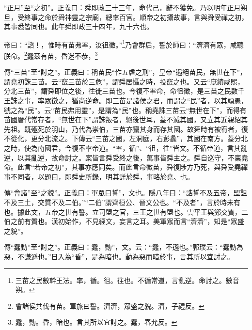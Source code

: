 {\noindent\shu{}\fzkt “正月”至“之初”。正義曰：舜即政三十三年，命代己，辭不獲免。乃以明年正月朔旦，受終事之命於舜神靈之宗廟，總率百官。順帝之初攝故事，言與舜受禪之初，其事悉皆同也。此年舜即政三十四年，九十六也。 \par}

帝曰：“諮！，惟時有苗弗率，汝徂徵。”\footnote{三苗之民數幹王法。率，循。徂。往也。不循常道，言亂逆。命討之。數音朔。}乃會群后，誓於師曰：“濟濟有眾，咸聽朕命。\footnote{會諸侯共伐有苗。軍旅曰誓。濟濟，眾盛之貌。濟，子禮反。}蠢茲有苗，昏迷不恭，\footnote{蠢，動。昏，暗也。言其所以宜討之。蠢，春允反。}

{\noindent\zhuan{}\fzbyks 傳“三苗”至“討之”。正義曰：稱苗民“作五虐之刑”，皇帝“遏絕苗民，無世在下”，謂堯初誅三苗。云“竄三苗於三危”，謂舜居攝之時，投竄之也。又云“庶績咸熙，分北三苗”，謂舜即位之後，往徙三苗也。今復不率命，命徂徵，是三苗之民數千王誅之事，率眾徵之，猶尚逆命。即三苗是諸侯之君，而謂之“民”者，以其頑愚，號之為“民”。云“苗民弗用靈”，是謂為“民”也。稱堯誅三苗云“無世在下”，而得有苗國曆代常存者，“無世在下”謂誅叛者，絕後世耳，蓋不滅其國，又立其近親紹其先祖。既殛死於羽山，乃代為崇伯，三苗亦竄其身而存其國。故舜時有被宥者，復不從化，更分北流之。下傳云“三苗之國，左洞庭，右彭蠡”，其國在南方。蓋分北之時，使為南國君，今復不率帝道。“率，循”、“徂，往”皆文。不循帝道，言其亂逆，以其亂逆，故命討之。案皆言舜受終之後，萬事皆舜主之。舜自巡守，不稟堯命。此言“若帝之初”，其事亦應同矣。而此言命徵苗，舜復陟方乃死，與舜受堯禪事不同者，以題曰，即舜史所錄，明其詳於舜，事略於堯、也。 \par}

{\noindent\zhuan{}\fzbyks 傳“會諸”至“之貌”。正義曰：軍眾曰誓”，文也。隱八年曰：“誥誓不及五帝，盟詛不及三土，交質不及二伯。”“二伯”謂齊桓公、晉文公也。“不及者”，言於時未有也。據此文，五帝之世有誓。立司盟之官，三王之世有盟也。雲平王與鄭交質，二伯之前有質也。漢初始作，不見經文，妄言之耳。美軍眾而言“濟濟”，知是“眾盛之貌”。 \par}

{\noindent\zhuan{}\fzbyks 傳“蠢動”至“討之”。正義曰：蠢，動”，文。云：“蠢，不遜也。”郭璞云：“蠢動為惡，不謙遜也。”日入為“昏”，是為暗也。動為惡而暗於事，言其所以宜討之。 \par}

